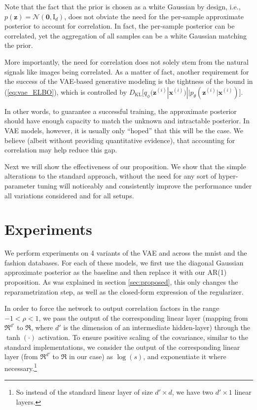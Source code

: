 \documentclass{article}
\begin{document}
Note that the fact that the prior is chosen as a white Gaussian by design, i.e., $p(\mathbf{z}) = \mathcal{N}(\mathbf{0}, \mathrm{I}_d)$, does not obviate the need for the per-sample approximate posterior to account for correlation. In fact, the per-sample posterior can be correlated, yet the aggregation of all samples can be a white Gaussian matching the prior.

More importantly, the need for correlation does not solely stem from the natural signals like images being correlated. As a matter of fact, another requirement for the success of the VAE-based generative modeling is the tightness of the bound in (\ref{eq:vae_ELBO}), which is controlled by $D_{\text{KL}}\big[ q_{\phi}(\mathbf{z}^{(i)}  | \mathbf{x}^{(i)}) || p_{\theta}(\mathbf{z}^{(i)} | \mathbf{x}^{(i)}) \big]$.

In other words, to guarantee a successful training, the approximate posterior should have enough capacity to match the unknown and intractable posterior. In VAE models, however, it is usually only ``hoped'' that this will be the case. We believe (albeit without providing quantitative evidence), that accounting for correlation may help reduce this gap.

Next we will show the effectiveness of our proposition. We show that the simple alterations to the standard approach, without the need for any sort of hyper-parameter tuning will noticeably and consistently improve the performance under all variations considered and for all setups. 

\section{Experiments} \label{sec:exp} 

We perform experiments on 4 variants of the VAE and across the mnist \cite{lecun-mnisthandwrittendigit-2010} and the fashion \cite{xiao2017fashion} databases. For each of these models, we first use the diagonal Gaussian approximate posterior as the baseline and then replace it with our AR(1) proposition. As was explained in section \ref{sec:proposed}, this only changes the reparametrization step, as well as the closed-form expression of the regularizer.

In order to force the network to output correlation factors in the range $-1 < \rho < 1$, we pass the output of the corresponding linear layer (mapping from $\Re^{d'}$ to $\Re$, where $d'$ is the dimension of an intermediate hidden-layer) through the $\tanh(\cdot)$ activation. To ensure positive scaling of the covariance, similar to the standard implementations, we consider the output of the corresponding linear layer (from $\Re^{d'}$ to $\Re$ in our case) as $\log(s)$, and exponentiate it where necessary.\footnote{So instead of the standard linear layer of size $d' \times d$, we have two $d' \times 1$ linear layers.}
\end{document}
